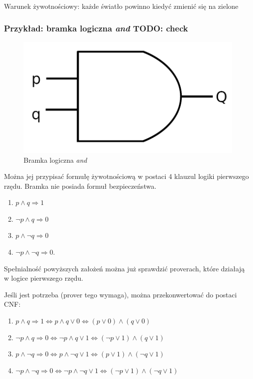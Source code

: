 \documentclass[a4paper,12pt]{article}
\begin{document}
\noindent
Warunek żywotnościowy: każde światło powinno kiedyć zmienić się na zielone

\subsubsection{Przykład: bramka logiczna \textit{and} TODO: check}

\begin{figure}[H]
  \centering
  \includegraphics[scale=0.5]{images/AND.png}
  \caption{Bramka logiczna \textit{and}}
\end{figure}

Można jej przypisać formułę żywotnościową w postaci 4 klauzul logiki pierwszego rzędu. Bramka nie posiada formuł bezpieczeństwa.

\begin{enumerate}
  \item $p \land q \Rightarrow 1$
  \item $\lnot p \land q \Rightarrow 0$
  \item $p \land \lnot q \Rightarrow 0$
  \item $\lnot p \land \lnot q \Rightarrow 0$.
\end{enumerate}

\noindent
Spełnialność powyższych założeń można już sprawdzić proverach, które działają w logice pierwszego rzędu.

Jeśli jest potrzeba (\gls{prover} tego wymaga), można przekonwertować do postaci \gls{CNF}:

\begin{enumerate}
  \item $p \land q \Rightarrow 1 \Leftrightarrow p \land q \lor 0 \Leftrightarrow (p \lor 0) \land (q \lor 0)$
  \item $\lnot p \land q \Rightarrow 0 \Leftrightarrow \lnot p \land q \lor 1 \Leftrightarrow (\lnot p \lor 1) \land (q \lor 1) $
  \item $p \land \lnot q \Rightarrow 0 \Leftrightarrow p \land \lnot q \lor 1 \Leftrightarrow (p \lor 1) \land (\lnot q \lor 1)$
  \item $\lnot p \land \lnot q \Rightarrow 0 \Leftrightarrow \lnot p \land \lnot q \lor 1 \Leftrightarrow (\lnot p \lor 1) \land (\lnot q \lor 1)$
\end{enumerate}
\end{document}
